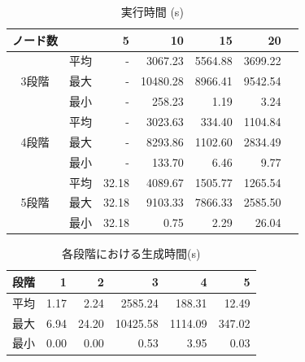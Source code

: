 \documentclass[exploratorypaper]{jsaiart} %
\begin{document}
\begin{table}[htbp]
\caption{実行時間 (s)}
\label{tbl:result2}
\begin{tabular}{c|crrrrr}
    ノード数& & 5&	10&   15&	 20\\
    \hline \hline
         & 平均& -&  3067.23& 5564.88&  3699.22\\
    3段階& 最大& -& 10480.28& 8966.41&  9542.54\\
         & 最小& -&   258.23&    1.19&	  3.24\\
    \hline
         & 平均& -&  3023.63&   334.40& 1104.84\\
    4段階& 最大& -&  8293.86&  1102.60& 2834.49\\
         & 最小& -&   133.70&     6.46&    9.77\\
    \hline
         & 平均& 32.18&  4089.67&  1505.77& 1265.54\\
    5段階& 最大& 32.18&  9103.33&  7866.33& 2585.50\\
         & 最小& 32.18&     0.75&     2.29&   26.04\\
    \hline
\end{tabular}
\end{table}

\begin{table}[htbp]
\caption{各段階における生成時間(s)}
\label{tbl:result3}
\begin{tabular}{c|rrrrr}
    段階&	1&	2&	3&	4&	5\\
    \hline
    \hline
    平均&	1.17&	2.24&	2585.24&	188.31&     12.49\\
    最大&	6.94&	24.20&	10425.58&	1114.09&	347.02\\
    最小&	0.00&	0.00&	0.53&	    3.95&	    0.03\\
    \hline
\end{tabular}
\end{table}


\end{document}
